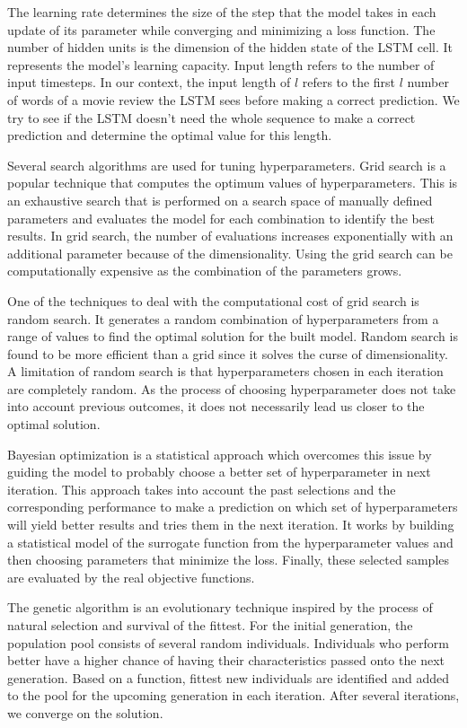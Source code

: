 \documentclass[conference]{IEEEtran}
\begin{document}
The learning rate determines the size of the step that the model takes in each update of its parameter while converging and minimizing a loss function. The number of hidden units is the dimension of the hidden state of the LSTM cell. It represents the model's learning capacity. Input length refers to the number of input timesteps. In our context, the input length of $l$ refers to the first $l$ number of words of a movie review the LSTM sees before making a correct prediction. We try to see if the LSTM doesn't need the whole sequence to make a correct prediction and determine the optimal value for this length.  

Several search algorithms are used for tuning hyperparameters. Grid search is a popular technique that computes the optimum values of hyperparameters. This is an exhaustive search that is performed on a search space of manually defined parameters and evaluates the model for each combination to identify the best results. In grid search, the number of evaluations increases exponentially with an additional parameter because of the dimensionality. Using the grid search can be computationally expensive as the combination of the parameters grows.

One of the techniques to deal with the computational cost of grid search is random search. It generates a random combination of hyperparameters from a range of values to find the optimal solution for the built model. Random search is found to be more efficient than a grid \cite{random} since it solves the curse of dimensionality. A limitation of random search is that hyperparameters chosen in each iteration are completely random. As the process of choosing hyperparameter does not take into account previous outcomes, it does not necessarily lead us closer to the optimal solution.

Bayesian optimization is a statistical approach which overcomes this issue by guiding the model to probably choose a better set of hyperparameter in next iteration. This approach takes into account the past selections and the corresponding performance to make a prediction on which set of hyperparameters will yield better results and tries them in the next iteration. It works by building a statistical model of the surrogate function from the hyperparameter values and then choosing parameters that minimize the loss. Finally, these selected samples are evaluated by the real objective functions.


The genetic algorithm is an evolutionary technique inspired by the process of natural selection and survival of the fittest. For the initial generation, the population pool consists of several random individuals. Individuals who perform better have a higher chance of having their characteristics passed onto the next generation. Based on a function, fittest new individuals are identified and added to the pool for the upcoming generation in each iteration. After several iterations, we converge on the solution.
\end{document}
